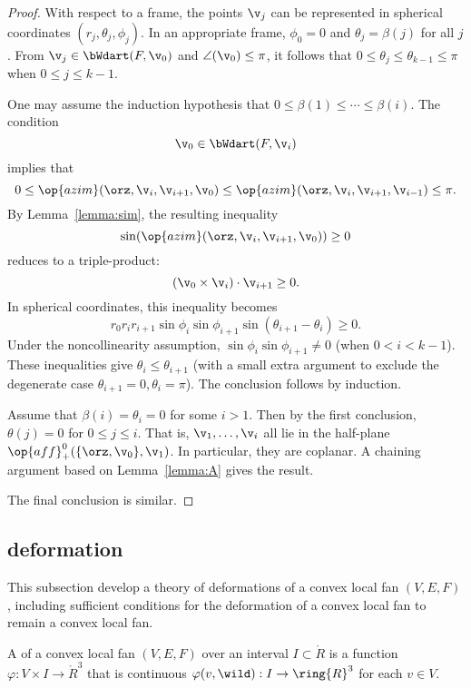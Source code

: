 \begin{proof}  
  With respect to a frame, the points $\v_j$ can be represented in
  spherical coordinates $(r_j,\theta_j,\phi_j)$.  In an appropriate
  frame, $\phi_0=0$ and $\theta_j=\beta(j)$ for all $j$.  From
  $\v_j\in \bWdart(F,\v_0)$ and $\angle(\v_0)\le\pi$, it follows that
  $0\le\theta_j\le\theta_{k-1}\le\pi$ when $0\le j\le k-1$.

One may assume the induction hypothesis that $0\le \beta(1)\le\cdots\le
\beta(i)$.  The condition
\[ 
\v_0\in \bWdart(F,\v_i)
\] 
implies that
\[ 
  0 \le \op{azim}(\orz,\v_i,\v_{i+1},\v_0)
\le \op{azim}(\orz,\v_i,\v_{i+1},\v_{i-1})\le\pi.
\] 
By Lemma~\ref{lemma:sim}, the resulting inequality
\[ 
\sin(\op{azim}(\orz,\v_i,\v_{i+1},\v_0))\ge 0
\] 
reduces to a triple-product:
\[ 
(\v_0 \times \v_i)\cdot \v_{i+1}\ge 0.
\] 
In spherical coordinates, this inequality becomes
\[ 
r_0r_ir_{i+1}\sin\phi_i\sin\phi_{i+1}\sin(\theta_{i+1}-\theta_i)\ge0.
\] 
Under the noncollinearity assumption, $\sin\phi_i\sin\phi_{i+1}\ne0$
(when $0< i < k-1$).  These inequalities give
$\theta_i\le\theta_{i+1}$ (with a small extra argument to exclude the
degenerate case $\theta_{i+1}=0,\theta_i=\pi$).  The conclusion
follows by induction.

Assume that $\beta(i)=\theta_i=0$ for some $i>1$.  Then by the first
conclusion, $\theta(j)=0$ for $0\le j\le i$.  That is, 
$\v_1,\ldots,\v_i$ all lie in the half-plane
$\op{aff}^0_+(\{\orz,\v_0\},\v_1)$.  In particular, they are coplanar.
A chaining argument based on Lemma~\ref{lemma:A} gives the result.

The final conclusion is similar.
\end{proof}



\subsection{deformation}\label{sec:deformation}


This subsection develop a theory of deformations of a convex local fan
$(V,E,F)$, including sufficient conditions for the deformation of a
convex local fan to remain a convex local fan.


\begin{definition}[deformation]
A  
of a convex local fan $(V,E,F)$ over an interval
$I\subset\ring{R}$ is a function $\varphi:V\times I
\to\ring{R}^3$ that is continuous $\varphi(v,\wild):I\to\ring{R}^3$
for each $v\in V$.
\end{definition}
%
%

